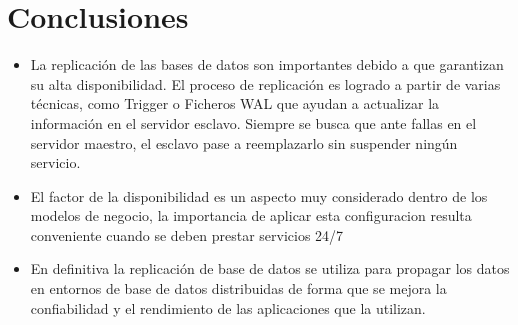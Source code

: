 \section{Conclusiones}

\begin{itemize}
	\item La replicación de las bases de datos son importantes debido a que garantizan su alta disponibilidad. El proceso de replicación es logrado a partir de varias técnicas, como Trigger o Ficheros WAL que ayudan a actualizar la información en el servidor esclavo. Siempre se busca que ante fallas en el servidor maestro, el esclavo pase a reemplazarlo sin suspender ningún servicio.\\
    
    \item El factor de la disponibilidad es un aspecto muy considerado dentro de los modelos de negocio, la importancia de aplicar esta configuracion resulta conveniente cuando se deben prestar servicios 24/7    \\

    
    \item En definitiva la replicación de base de datos se utiliza para propagar los datos en entornos de base de datos distribuidas de forma que se mejora la confiabilidad y el rendimiento de las aplicaciones que la utilizan. 
\end{itemize}
